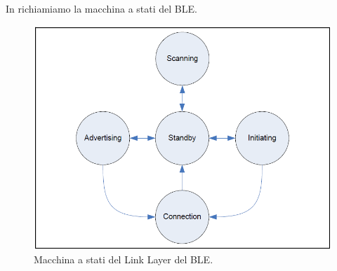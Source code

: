 In  richiamiamo la macchina a stati del BLE.
\begin{figure}[tb]
	\centering
	\includegraphics[width=0.8\linewidth]{Images/bt/bt_fsa}
	\caption[ble fsa]{Macchina a stati del Link Layer del BLE.}
	\label{fig:bt_fsa2}
\end{figure}
\bigskip

